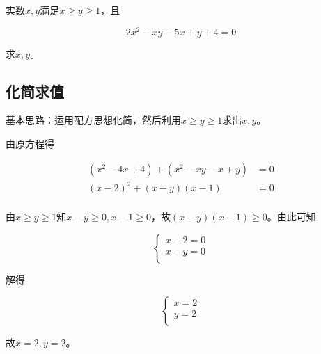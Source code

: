 

实数$x, y$满足$x \ge y \ge1$，且

\[ 2x^2 - xy - 5x + y + 4 = 0 \]

求$x, y$。


\subsection{化简求值}

基本思路：运用配方思想化简，然后利用$x \ge y \ge1$求出$x, y$。

由原方程得

\begin{align*}
  (x^2 - 4x + 4) + (x^2 - xy - x + y) &= 0 \\
  (x - 2)^2 + (x - y)(x - 1) &= 0 \\
\end{align*}

由$x \ge y \ge1$知$x - y \ge0, x - 1 \ge0$，故$(x - y)(x - 1) \ge0$。由此可知

\[ \begin{cases}
  x - 2 = 0 \\
  x - y = 0 \\
\end{cases} \]

解得

\[ \begin{cases}
  x = 2 \\ y = 2 \\
\end{cases} \]

故$x = 2, y = 2$。
